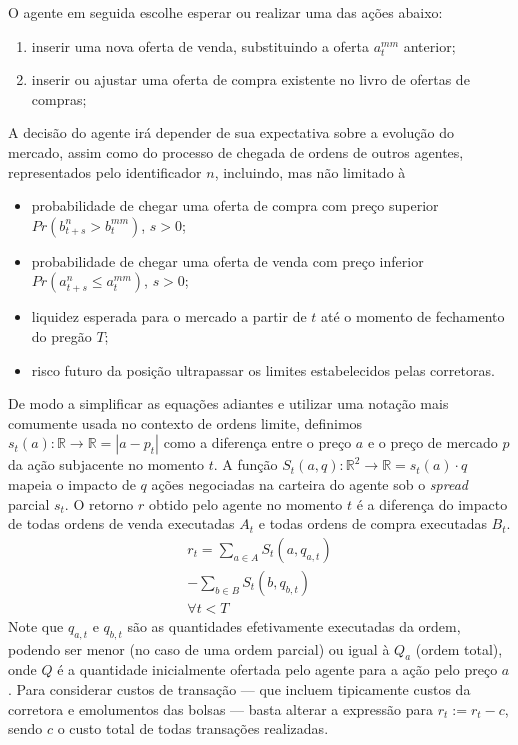 O agente em seguida escolhe esperar ou realizar uma das ações abaixo:
\begin{enumerate}
    \item inserir uma nova oferta de venda, substituindo a oferta $a_t^{mm}$ anterior;
    \item inserir ou ajustar uma oferta de compra existente no livro de ofertas de compras;
\end{enumerate}

A decisão do agente irá depender de sua expectativa sobre a evolução do mercado, assim como do processo de chegada de ordens de outros agentes, representados pelo identificador $n$, incluindo, mas não limitado à
\begin{itemize}
    \item probabilidade de chegar uma oferta de compra com preço superior $Pr(b_{t + s}^{n} > b_{t}^{mm})$, $s > 0$; 
    \item probabilidade de chegar uma oferta de venda com preço inferior $Pr(a_{t + s}^{n} \leq a_{t}^{mm})$, $s > 0$;
    \item liquidez esperada para o mercado a partir de $t$ até o momento de fechamento do pregão $T$;
    \item risco futuro da posição ultrapassar os limites estabelecidos pelas corretoras.
\end{itemize}

De modo a simplificar as equações adiantes e utilizar uma notação mais comumente usada no contexto de ordens limite, definimos $s_{t}(a): \mathbb{R} \rightarrow \mathbb{R} = |a - p_{t}|$ como a diferença entre o preço $a$ e o preço de mercado $p$ da ação subjacente no momento $t$.
A função $S_{t}(a, q): \mathbb{R}^{2} \rightarrow \mathbb{R} = s_{t}(a) \cdot q$ mapeia o impacto de $q$ ações negociadas na carteira do agente sob o \textit{spread} parcial $s_t$.
O retorno $r$ obtido pelo agente no momento $t$ é a diferença do impacto de todas ordens de venda executadas $A_{t}$ e todas ordens de compra executadas $B_{t}$. 
\begin{equation} \label{return}
	\begin{aligned}
		r_{t} = \sum_{a \in A} S_{t}(a, q_{a, t}) \\
		-\sum_{b \in B} S_{t}(b, q_{b, t}) \\
		\forall t < T
	\end{aligned}
\end{equation}
Note que $q_{a, t}$ e $q_{b, t}$ são as quantidades efetivamente executadas da ordem, podendo ser menor (no caso de uma ordem parcial) ou igual à $Q_{a}$ (ordem total), onde $Q$ é a quantidade inicialmente ofertada pelo agente para a ação pelo preço $a$.
Para considerar custos de transação — que incluem tipicamente custos da corretora e emolumentos das bolsas — basta alterar a expressão para $r_{t} := r_{t} - c$, sendo $c$ o custo total de todas transações realizadas.

